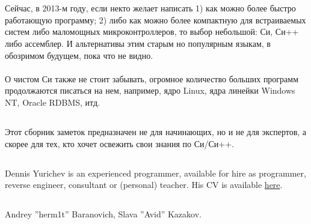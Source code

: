﻿\chapter{}

Сейчас, в 2013-м году, если некто желает написать 1) как можно более быстро работающую программу; 2) либо как
можно более компактную для встраиваемых систем либо маломощных микроконтроллеров, то выбор небольшой:
Си, Си++ либо ассемблер. И альтернативы этим старым но популярным языкам, в обозримом будущем, 
пока что не видно. \\
\\
О чистом Си также не стоит забывать, огромное количество больших программ продолжаются писаться на нем, 
например, ядро Linux, ядра линейки Windows NT, Oracle RDBMS, итд.

\section{}

Этот сборник заметок предназначен не для начинающих, но и не для экспертов, а скорее для тех, 
кто хочет освежить свои знания по Си/Си++.

\section{}

{Dennis Yurichev is an experienced programmer, available for hire as programmer, reverse engineer, consultant or (personal) teacher.
His CV is available \href{http://yurichev.com/Dennis_Yurichev.pdf}{here}.}

\section{}

{Andrey ''herm1t'' Baranovich, Slava ''Avid'' Kazakov}.


